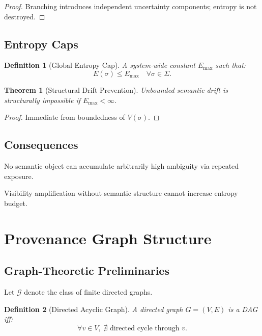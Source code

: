 \documentclass[11pt]{article}
\newtheorem{definition}{Definition}
\newtheorem{theorem}{Theorem}
\begin{document}
\begin{proof}
Branching introduces independent uncertainty components; entropy is not destroyed.
\end{proof}

\subsection{Entropy Caps}

\begin{definition}[Global Entropy Cap]
A system-wide constant $E_{\max}$ such that:
\[
E(\sigma) \le E_{\max} \quad \forall \sigma \in \Sigma.
\]
\end{definition}

\begin{theorem}[Structural Drift Prevention]
Unbounded semantic drift is structurally impossible if $E_{\max} < \infty$.
\end{theorem}

\begin{proof}
Immediate from boundedness of $V(\sigma)$.
\end{proof}

\subsection{Consequences}

\begin{corollary}
No semantic object can accumulate arbitrarily high ambiguity via repeated exposure.
\end{corollary}

\begin{corollary}
Visibility amplification without semantic structure cannot increase entropy budget.
\end{corollary}

\section{Provenance Graph Structure}

\subsection{Graph-Theoretic Preliminaries}

Let $\mathcal{G}$ denote the class of finite directed graphs.

\begin{definition}[Directed Acyclic Graph]
A directed graph $G = (V,E)$ is a DAG iff:
\[
\forall v \in V,\; \nexists \text{ directed cycle through } v.
\]
\end{definition}
\end{document}
